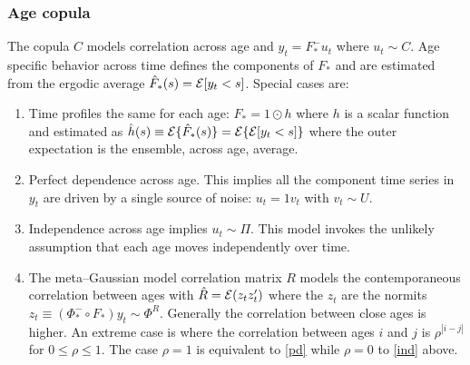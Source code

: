 \documentclass[a4paper,12pt]{article}
\newcommand{\Ex}{{\cal E}}
\begin{document}
\subsubsection{Age copula}  The copula $C$ models correlation across age and $y_t=F_*^-u_t$ where $u_t\sim C$. Age specific behavior across time defines the components of $F_*$ and are estimated from the ergodic average $\hat F_*(s) =\Ex[y_t<s]$.
Special cases are:
    \begin{enumerate}
        \item Time profiles the same for each age: $F_*=1\odot h$ where $h$ is a scalar function and estimated as $\hat h(s)\equiv\Ex\{\hat F_*(s)\}=\Ex\{\Ex[y_t<s]\}$ where the outer expectation is the ensemble, across age, average.
        \item \label{pd} Perfect dependence across age.  This implies all the component time series in $y_t$ are driven by a single source of noise: $u_t=1v_t$ with $v_t\sim U$.
        \item \label{ind} Independence across age implies $u_t\sim \Pi$.  This model invokes the unlikely assumption that each age moves independently over time.
        \item   The meta--Gaussian model correlation matrix $R$ models the contemporaneous correlation between ages with $\hat R=\Ex(z_tz_t')$ where the $z_t$ are the normits $z_t\equiv(\Phi_*^-\circ F_*)y_t\sim\Phi^R$.  Generally the correlation between close ages is  higher.   An extreme case is where the correlation between ages $i$ and $j$ is $\rho^{|i-j|}$ for $0\le\rho\le 1$.  The case $\rho=1$ is equivalent to \ref{pd} while $\rho=0$ to \ref{ind} above.
    \end{enumerate}
\end{document}
